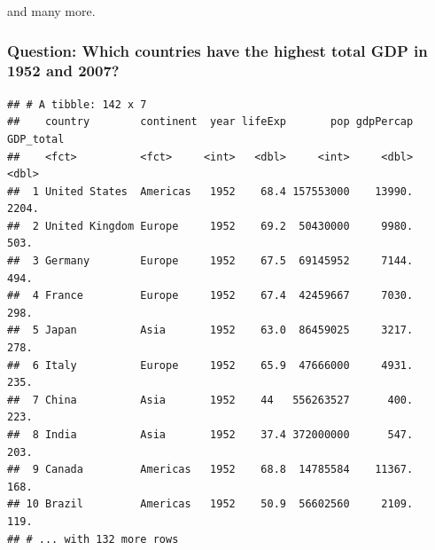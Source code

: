 \documentclass[11pt,]{article}
\newenvironment{Shaded}{\begin{snugshade}}{\end{snugshade}}
\newcommand{\KeywordTok}[1]{\textcolor[rgb]{0.13,0.29,0.53}{\textbf{#1}}}
\newcommand{\DecValTok}[1]{\textcolor[rgb]{0.00,0.00,0.81}{#1}}
\newcommand{\StringTok}[1]{\textcolor[rgb]{0.31,0.60,0.02}{#1}}
\newcommand{\OperatorTok}[1]{\textcolor[rgb]{0.81,0.36,0.00}{\textbf{#1}}}
\newcommand{\NormalTok}[1]{#1}
\begin{document}
and many more.

\subsubsection{Question: Which countries have the highest total GDP in
1952 and
2007?}\label{question-which-countries-have-the-highest-total-gdp-in-1952-and-2007}

\begin{Shaded}
\end{Shaded}

\begin{verbatim}
## # A tibble: 142 x 7
##    country        continent  year lifeExp       pop gdpPercap GDP_total
##    <fct>          <fct>     <int>   <dbl>     <int>     <dbl>     <dbl>
##  1 United States  Americas   1952    68.4 157553000    13990.     2204.
##  2 United Kingdom Europe     1952    69.2  50430000     9980.      503.
##  3 Germany        Europe     1952    67.5  69145952     7144.      494.
##  4 France         Europe     1952    67.4  42459667     7030.      298.
##  5 Japan          Asia       1952    63.0  86459025     3217.      278.
##  6 Italy          Europe     1952    65.9  47666000     4931.      235.
##  7 China          Asia       1952    44   556263527      400.      223.
##  8 India          Asia       1952    37.4 372000000      547.      203.
##  9 Canada         Americas   1952    68.8  14785584    11367.      168.
## 10 Brazil         Americas   1952    50.9  56602560     2109.      119.
## # ... with 132 more rows
\end{verbatim}

\begin{Shaded}
\end{Shaded}
\end{document}
